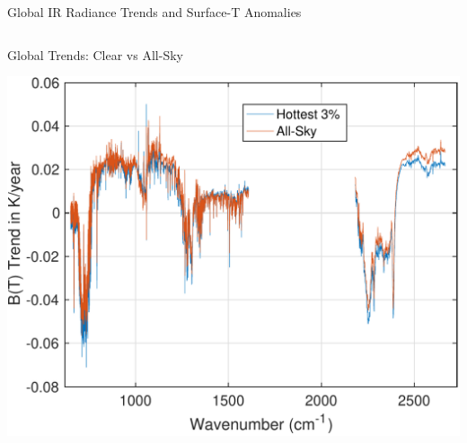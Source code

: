 \documentclass[10pt,t]{beamer}
\begin{document}
\begin{frame}{Global IR Radiance Trends and Surface-T Anomalies}
\vspace{-0.35in}

\begin{columns}
\begin{column}{0.55\columnwidth}
\begin{block}{\footnotesize Global Trends: Clear vs All-Sky}
\vspace{-0.1in}
\begin{center}
\includegraphics[width=\linewidth]{SunClimate2022/global_trends_hottest3pc_and)allsky.pdf}
\end{center}
\end{block}
\end{column}



\end{columns}
\end{frame}
\end{document}
